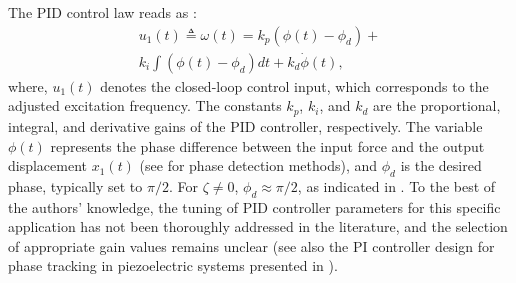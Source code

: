 \documentclass[preprint,12pt]{elsarticle}
\begin{document}
The PID control law reads as \cite{kuo}:
\begin{equation}
\begin{array}{l}
u_1(t)\triangleq\omega(t)=k_p (\phi(t)-\phi_d)+ \\ k_i \int (\phi(t)-\phi_d) dt+  k_d \dot{\phi}(t), 
\end{array}
\label{E_frequency_PID}
\end{equation}
where, $u_1(t)$ denotes the closed-loop control input, which corresponds to the adjusted excitation frequency. The constants $k_p$, $k_i$, and $k_d$ are the proportional, integral, and derivative gains of the PID controller, respectively. The variable $\phi(t)$ represents the phase difference between the input force and the output displacement $x_1(t)$ (see  for phase detection methods), and $\phi_d$ is the desired phase, typically set to $\pi/2$. For $\zeta \neq 0$, $\phi_d \approx \pi/2$, as indicated in . To the best of the authors' knowledge, the tuning of PID controller parameters for this specific application has not been thoroughly addressed in the literature, and the selection of appropriate gain values remains unclear (see also the PI controller design for phase tracking in piezoelectric systems presented in \cite{s22176378}).
\end{document}

